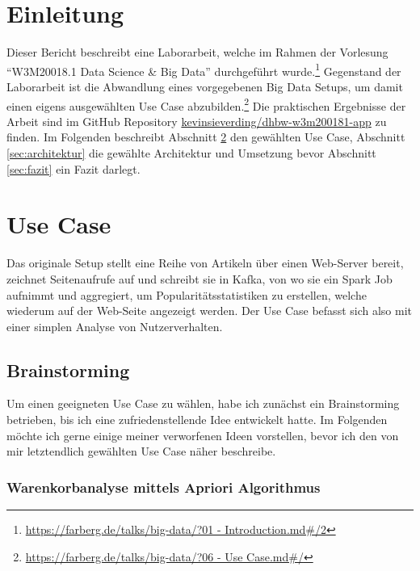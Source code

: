 
\section{Einleitung}\label{sec:einleitung}

Dieser Bericht beschreibt eine Laborarbeit, welche im Rahmen der Vorlesung \enquote{W3M20018.1 Data Science \& Big Data} durchgeführt wurde.\footnote{\href{https://farberg.de/talks/big-data/?01\%20-\%20Introduction.md\#/2}{https://farberg.de/talks/big-data/?01 - Introduction.md\#/2}}
Gegenstand der Laborarbeit ist die Abwandlung eines vorgegebenen Big Data Setups, um damit einen eigens ausgewählten Use Case abzubilden.\footnote{\href{https://farberg.de/talks/big-data/?06\%20-\%20Use\%20Case.md\#/}{https://farberg.de/talks/big-data/?06 - Use Case.md\#/}}
Die praktischen Ergebnisse der Arbeit sind im GitHub Repository \href{https://github.com/kevinsieverding/dhbw-w3m200181-app}{kevinsieverding/dhbw-w3m200181-app} zu finden.
Im Folgenden beschreibt Abschnitt \ref{sec:use-case} den gewählten Use Case, Abschnitt \ref{sec:architektur} die gewählte Architektur und Umsetzung bevor Abschnitt \ref{sec:fazit} ein Fazit darlegt.

\section{Use Case}\label{sec:use-case}

Das originale Setup stellt eine Reihe von Artikeln über einen Web-Server bereit, zeichnet Seitenaufrufe auf und schreibt sie in Kafka, von wo sie ein Spark Job aufnimmt und aggregiert, um Popularitätsstatistiken zu erstellen, welche wiederum auf der Web-Seite angezeigt werden.
Der Use Case befasst sich also mit einer simplen Analyse von Nutzerverhalten.

\subsection{Brainstorming}

Um einen geeigneten Use Case zu wählen, habe ich zunächst ein Brainstorming betrieben, bis ich eine zufriedenstellende Idee entwickelt hatte.
Im Folgenden möchte ich gerne einige meiner verworfenen Ideen vorstellen, bevor ich den von mir letztendlich gewählten Use Case näher beschreibe.

\subsubsection{Warenkorbanalyse mittels Apriori Algorithmus}

